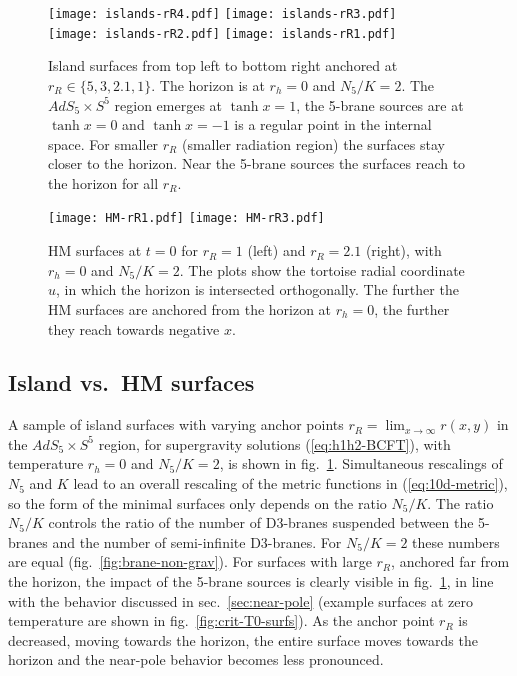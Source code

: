 \documentclass[aps,prd,11pt,notitlepage,longbibliography,nofootinbib,tightenlines,preprintnumbers]{revtex4-1}
\begin{document}
\begin{figure}
	\texttt{[image: islands-rR4.pdf]}
	\hskip 10mm
	\texttt{[image: islands-rR3.pdf]}
	\\
	\texttt{[image: islands-rR2.pdf]}
	\hskip 10mm
	\texttt{[image: islands-rR1.pdf]}	
	\caption{
		Island surfaces from top left to bottom right anchored at $r_R\in\lbrace 5,3,2.1,1\rbrace$. The horizon is at $r_h=0$ and $N_5/K=2$. 
		The $AdS_5\times S^5$ region emerges at $\tanh x=1$, the 5-brane sources are at $\tanh x=0$ and $\tanh x=-1$ is a regular point in the internal space. For smaller $r_R$ (smaller radiation region) the surfaces stay closer to the horizon. Near the 5-brane sources the surfaces reach to the horizon for all $r_R$.
		\label{fig:islands}
	}
\end{figure}

\begin{figure}
	\texttt{[image: HM-rR1.pdf]}
	\hskip 10mm
	\texttt{[image: HM-rR3.pdf]}	
	\caption{
		HM surfaces at $t=0$ for $r_R=1$ (left) and $r_R=2.1$ (right), with $r_h=0$ and $N_5/K=2$. The plots show the tortoise radial coordinate $u$, in which the horizon is intersected orthogonally. 
		The further the HM surfaces are anchored from the horizon at $r_h=0$, the further they reach towards negative $x$.
		\label{fig:HM-surf}
	}
\end{figure}

\subsection{Island vs.\ HM surfaces}

A sample of island surfaces with varying anchor points $r_R=\lim_{x\rightarrow\infty}r(x,y)$ in the $AdS_5\times S^5$ region, for supergravity solutions (\ref{eq:h1h2-BCFT}), with temperature $r_h=0$ and $N_5/K=2$, is shown in fig.~\ref{fig:islands}. 
Simultaneous rescalings of $N_5$ and $K$ lead to an overall rescaling of the metric functions in (\ref{eq:10d-metric}), so the form of the minimal surfaces only depends on the ratio $N_5/K$. The ratio $N_5/K$ controls the ratio of the number of D3-branes suspended between the 5-branes and the number of semi-infinite D3-branes. For $N_5/K=2$ these numbers are equal (fig.~\ref{fig:brane-non-grav}).
For surfaces with large $r_R$, anchored far from the horizon, the impact of the 5-brane sources is clearly visible in fig.~\ref{fig:islands}, in line with the behavior discussed in sec.~\ref{sec:near-pole} (example surfaces at zero temperature are shown in fig.~\ref{fig:crit-T0-surfs}).
As the anchor point $r_R$ is decreased, moving towards the horizon,
the entire surface moves towards the horizon and the near-pole behavior becomes less pronounced.
\end{document}
